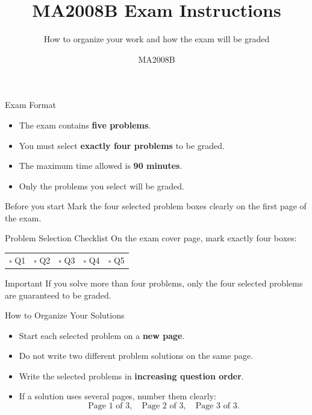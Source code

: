 \documentclass[aspectratio=169]{beamer}
\title{MA2008B Exam Instructions}
\subtitle{How to organize your work and how the exam will be graded}
\author{MA2008B}
\date{}
\begin{document}
\begin{frame}
  \titlepage
\end{frame}

\begin{frame}{Exam Format}
  \begin{itemize}
    \item The exam contains \textbf{five problems}.
    \item You must select \textbf{exactly four problems} to be graded.
    \item The maximum time allowed is \textbf{90 minutes}.
    \item Only the problems you select will be graded.
  \end{itemize}

  \vspace{0.6cm}

  \begin{block}{Before you start}
    Mark the four selected problem boxes clearly on the first page of the exam.
  \end{block}
\end{frame}

\begin{frame}{Problem Selection Checklist}
  On the exam cover page, mark exactly four boxes:

  \vspace{0.4cm}

  \begin{center}
    \begin{tabular}{ccccc}
      $\square$ Q1 & $\square$ Q2 & $\square$ Q3 & $\square$ Q4 & $\square$ Q5
    \end{tabular}
  \end{center}

  \vspace{0.6cm}

  \begin{alertblock}{Important}
    If you solve more than four problems, only the four selected problems are guaranteed to be graded.
  \end{alertblock}
\end{frame}

\begin{frame}{How to Organize Your Solutions}
  \begin{itemize}
    \item Start each selected problem on a \textbf{new page}.
    \item Do not write two different problem solutions on the same page.
    \item Write the selected problems in \textbf{increasing question order}.
    \item If a solution uses several pages, number them clearly:
      \[
        \text{Page 1 of 3}, \quad \text{Page 2 of 3}, \quad \text{Page 3 of 3}.
      \]
  \end{itemize}
\end{frame}
\end{document}
